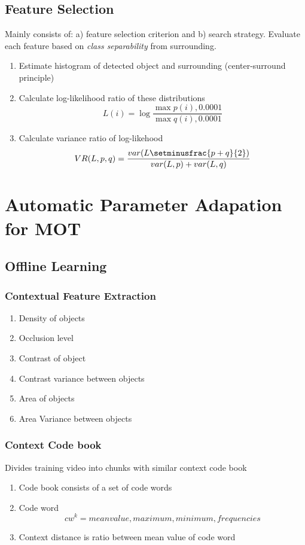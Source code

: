 \subsection{Feature
Selection}
Mainly
consists
of:
a)
feature
selection
criterion
and
b)
search
strategy.
Evaluate
each
feature
based
on
\textit{class
separability}
from
surrounding.

\begin{enumerate}
  \item
    Estimate
    histogram
    of
    detected
    object
    and
    surrounding
    (center-surround
    principle)
  \item
    Calculate
    log-likelihood
    ratio
    of
    these
    distributions
    \[L(i)
    =
    \log
    \frac{\max{p(i),
    0.0001}}{\max{q(i),
    0.0001}}\]
  \item
    Calculate
    variance
    ratio
    of
    log-likehood 
    \[VR(L,p,q)
    =
    \frac{var(L\setminusfrac{p+q}{2})}{var(L,p)
    +
    var(L,
    q)}\]
\end{enumerate}

\section{Automatic
Parameter
Adapation
for
MOT
\cite{Chau2013}}

\subsection{Offline
Learning}

\subsubsection{Contextual
Feature
Extraction}
\begin{enumerate}
  \item
    Density
    of
    objects
  \item
    Occlusion
    level
  \item
    Contrast
    of
    object
  \item
    Contrast
    variance
    between
    objects
  \item
    Area
    of
    objects
  \item
    Area
    Variance
    between
    objects
\end{enumerate}

\subsubsection{Context
Code
book}
Divides
training
video
into
chunks
with
similar
context
code
book
\begin{enumerate}
  \item
    Code
    book
    consists
    of
    a
    set
    of
    code
    words
  \item
    Code
    word 
    \[cw^{k}
    =
    {mean
    value,
    maximum,
    minimum,
    frequencies}\]
  \item
    Context
    distance
    is
    ratio
    between
    mean
    value
    of
    code
    word
\end{enumerate}

